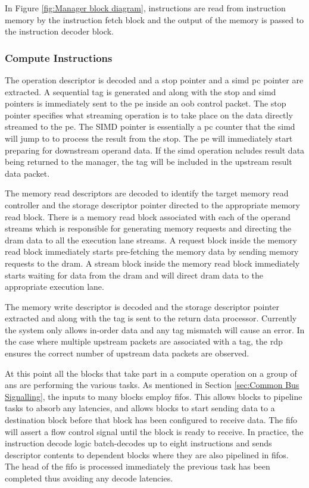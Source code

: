 In Figure \ref{fig:Manager block diagram}, instructions are read from instruction memory by the instruction fetch block and the output of the memory is passed to the instruction decoder block.

\subsubsection{Compute Instructions}
\label{sec:Decoding Compute Instructions}

The operation descriptor is decoded and a \ac{stop} pointer and a \ac{simd} \ac{pc} pointer are extracted. 
A sequential tag is generated and along with the \ac{stop} and \ac{simd} pointers is immediately sent to the \ac{pe} inside an \ac{oob} control packet.
The \ac{stop} pointer specifies what streaming operation is to take place on the data directly streamed to the \ac{pe}. 
The SIMD pointer is essentially a \ac{pc} counter that the \ac{simd} will jump to to process the result from the \ac{stop}.
The \ac{pe} will immediately start preparing for downstream operand data.
If the \ac{simd} operation ncludes result data being returned to the manager, the tag will be included in the upstream result data packet.

The memory read descriptors are decoded to identify the target memory read controller and the storage descriptor pointer directed to the appropriate memory read block.
There is a memory read block associated with each of the operand streams which is responsible for generating memory requests and directing the \ac{dram} data to all the execution lane streams.
A request block inside the memory read block immediately starts pre-fetching the memory data by sending memory requests to the \ac{dram}.
A stream block inside the memory read block immediately starts waiting for data from the \ac{dram} and will direct \ac{dram} data to the appropriate execution lane.

The memory write descriptor is decoded and the storage descriptor pointer extracted and along with the tag is sent to the return data processor.
Currently the system only allows in-order data and any tag mismatch will cause an error.
In the case where multiple upstream packets are associated with a tag, the \ac{rdp} ensures the correct number of upstream data packets are observed.

At this point all the blocks that take part in a compute operation on a group of \acp{an} are performing the various tasks.
As mentioned in Section \ref{sec:Common Bus Signalling}, the inputs to many blocks employ \acp{fifo}. 
This allows blocks to pipeline tasks to absorb any latencies, and allows blocks to start sending data to a destination block before that block has been configured to receive data.
The \ac{fifo} will assert a flow control signal until the block is ready to receive.
In practice, the instruction decode logic batch-decodes up to eight instructions and sends descriptor contents to dependent blocks where they are also pipelined in \acp{fifo}.
The head of the \ac{fifo} is processed immediately the previous task has been completed thus avoiding any decode latencies.

